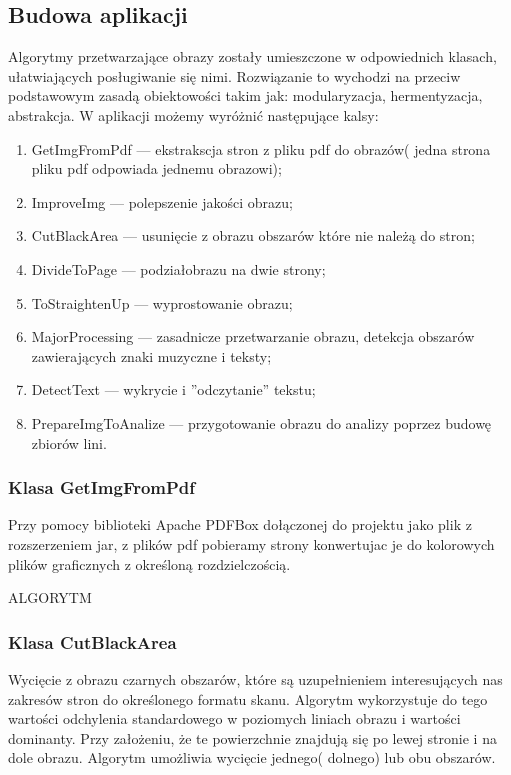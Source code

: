 \documentclass[a4paper,12pt]{article}
\begin{document}
	\subsection{Budowa aplikacji}
		Algorytmy przetwarzające obrazy zosta\l y umieszczone w odpowiednich klasach, u\l atwiających pos\l ugiwanie się nimi. Rozwiązanie to wychodzi na przeciw podstawowym zasadą obiektowości takim jak: modularyzacja, hermentyzacja, abstrakcja. W aplikacji możemy wyróżnić następujące kalsy: 
		\begin{enumerate}
			\item GetImgFromPdf --- ekstrakscja stron z pliku pdf do obrazów( jedna strona pliku pdf odpowiada jednemu obrazowi);
			\item ImproveImg --- polepszenie jakości obrazu;
			\item CutBlackArea --- usunięcie z obrazu obszarów które nie należą do stron;
			\item DivideToPage --- podzia\l obrazu na dwie strony;
			\item ToStraightenUp --- wyprostowanie obrazu;
			\item MajorProcessing --- zasadnicze przetwarzanie obrazu, detekcja obszarów zawierających znaki muzyczne i teksty; 
			\item DetectText --- wykrycie i ''odczytanie'' tekstu; 
			\item PrepareImgToAnalize --- przygotowanie obrazu do analizy poprzez budowę zbiorów lini.
		\end{enumerate} 

		\subsubsection{Klasa GetImgFromPdf}
			Przy pomocy biblioteki Apache PDFBox do\l ączonej do projektu jako plik z rozszerzeniem jar, z plików pdf pobieramy strony konwertujac je do kolorowych plików graficznych z określoną rozdzielczością.
	
			ALGORYTM
			
		\subsubsection{Klasa CutBlackArea}
			Wycięcie z obrazu czarnych obszarów, które są uzupe\l nieniem interesujących nas zakresów stron do określonego formatu skanu. Algorytm wykorzystuje do tego wartości odchylenia standardowego w poziomych liniach obrazu i wartości dominanty. Przy założeniu, że te powierzchnie znajdują się po lewej stronie i na dole obrazu. Algorytm umożliwia wycięcie jednego( dolnego) lub obu obszarów. 
			
\end{document}
